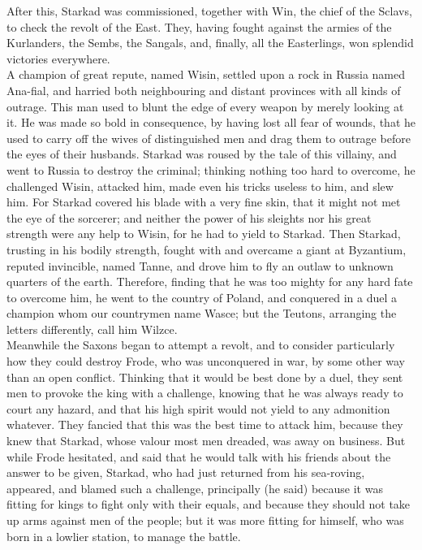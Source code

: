 \documentclass[10pt,a4paper]{report}
\begin{document}
After this, Starkad was commissioned, together with Win, the chief of the Sclavs, to check the revolt of the East. They, having fought against the armies of the Kurlanders, the Sembs, the Sangals, and, finally, all the Easterlings, won splendid victories everywhere.\\

A champion of great repute, named Wisin, settled upon a rock in Russia named Ana-fial, and harried both neighbouring and distant provinces with all kinds of outrage. This man used to blunt the edge of every weapon by merely looking at it. He was made so bold in consequence, by having lost all fear of wounds, that he used to carry off the wives of distinguished men and drag them to outrage before the eyes of their husbands. Starkad was roused by the tale of this villainy, and went to Russia to destroy the criminal; thinking nothing too hard to overcome, he challenged Wisin, attacked him, made even his tricks useless to him, and slew him. For Starkad covered his blade with a very fine skin, that it might not met the eye of the sorcerer; and neither the power of his sleights nor his great strength were any help to Wisin, for he had to yield to Starkad. Then Starkad, trusting in his bodily strength, fought with and overcame a giant at Byzantium, reputed invincible, named Tanne, and drove him to fly an outlaw to unknown quarters of the earth. Therefore, finding that he was too mighty for any hard fate to overcome him, he went to the country of Poland, and conquered in a duel a champion whom our countrymen name Wasce; but the Teutons, arranging the letters differently, call him Wilzce.\\

Meanwhile the Saxons began to attempt a revolt, and to consider particularly how they could destroy Frode, who was unconquered in war, by some other way than an open conflict. Thinking that it would be best done by a duel, they sent men to provoke the king with a challenge, knowing that he was always ready to court any hazard, and that his high spirit would not yield to any admonition whatever. They fancied that this was the best time to attack him, because they knew that Starkad, whose valour most men dreaded, was away on business. But while Frode hesitated, and said that he would talk with his friends about the answer to be given, Starkad, who had just returned from his sea-roving, appeared, and blamed such a challenge, principally (he said) because it was fitting for kings to fight only with their equals, and because they should not take up arms against men of the people; but it was more fitting for himself, who was born in a lowlier station, to manage the battle.\\
\end{document}
